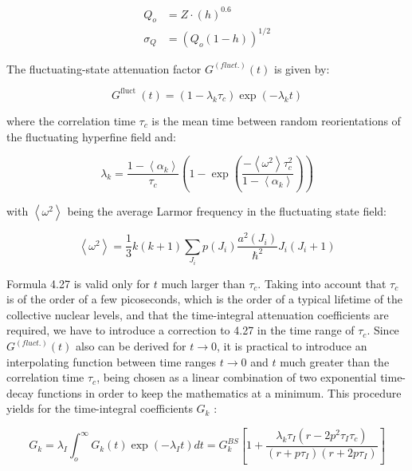 \documentclass[10pt]{article}
\begin{document}
\begin{align*}
Q_{o} & =Z \cdot(h)^{0.6}  \tag{4.26}\\
\sigma_{Q} & =\left(Q_{o}(1-h)\right)^{1 / 2}
\end{align*}


The fluctuating-state attenuation factor $G^{(f l u c t .)}(t)$ is given by:


\begin{equation*}
G^{\text {fluct }}(t)=\left(1-\lambda_{k} \tau_{c}\right) \exp \left(-\lambda_{k} t\right) \tag{4.27}
\end{equation*}


where the correlation time $\tau_{c}$ is the mean time between random reorientations of the fluctuating hyperfine field and:


\begin{equation*}
\lambda_{k}=\frac{1-\left\langle\alpha_{k}\right\rangle}{\tau_{c}}\left(1-\exp \left(\frac{-\left\langle\omega^{2}\right\rangle \tau_{c}^{2}}{1-\left\langle\alpha_{k}\right\rangle}\right)\right) \tag{4.28}
\end{equation*}


with $\left\langle\omega^{2}\right\rangle$ being the average Larmor frequency in the fluctuating state field:


\begin{equation*}
\left\langle\omega^{2}\right\rangle=\frac{1}{3} k(k+1) \sum_{J_{i}} p\left(J_{i}\right) \frac{a^{2}\left(J_{i}\right)}{\hbar^{2}} J_{i}\left(J_{i}+1\right) \tag{4.29}
\end{equation*}


Formula 4.27 is valid only for $t$ much larger than $\tau_{c}$. Taking into account that $\tau_{c}$ is of the order of a few picoseconds, which is the order of a typical lifetime of the collective nuclear levels, and that the time-integral attenuation coefficients are required, we have to introduce a correction to 4.27 in the time range of $\tau_{c}$. Since $G^{(f l u c t .)}(t)$ also can be derived for $t \rightarrow 0$, it is practical to introduce an interpolating function between time ranges $t \rightarrow 0$ and $t$ much greater than the correlation time $\tau_{c}$, being chosen as a linear combination of two exponential time-decay functions in order to keep the mathematics at a minimum. This procedure yields for the time-integral coefficients $G_{k}$ :


\begin{equation*}
G_{k}=\lambda_{I} \int_{o}^{\infty} G_{k}(t) \exp \left(-\lambda_{I} t\right) d t=G_{k}^{B S}\left[1+\frac{\lambda_{k} \tau_{I}\left(r-2 p^{2} \tau_{I} \tau_{c}\right)}{\left(r+p \tau_{I}\right)\left(r+2 p \tau_{I}\right)}\right] \tag{4.30}
\end{equation*}
\end{document}
